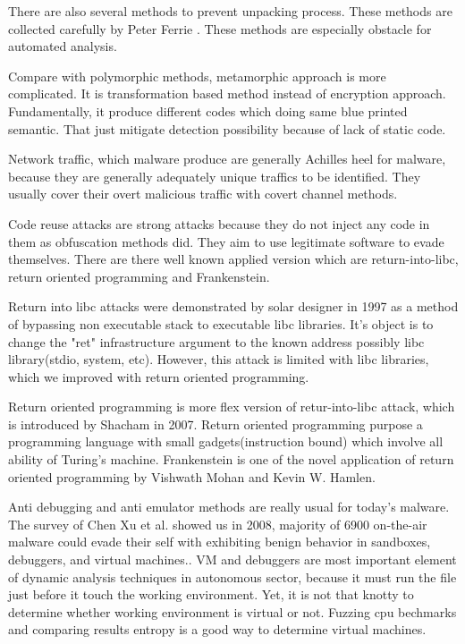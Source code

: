 There are also several methods to prevent unpacking process. These methods are collected carefully by Peter Ferrie \cite{ferrie2008anti}. These methods are especially obstacle for automated analysis.

Compare with polymorphic methods, metamorphic approach is more complicated. It is transformation based method instead of encryption  approach.\cite{konstantinou2008metamorphic} Fundamentally, it produce different codes which doing same blue printed semantic. That just mitigate detection possibility because of lack of static code. 

Network traffic, which malware produce are generally Achilles heel for malware, because they are generally adequately unique traffics to be identified\cite{marpaung2012survey}. They usually cover their overt malicious traffic with covert channel methods.\cite{rutkowska2006rootkits}

Code reuse attacks are strong attacks because they do not inject any code in them as obfuscation methods did. They aim to use legitimate software to evade themselves. There are there well known applied version which are return-into-libc, return oriented programming and Frankenstein.

Return into libc attacks were demonstrated by solar designer in 1997 as a method of bypassing non executable stack to executable libc libraries\cite{designer1997getting}. It's object is to change the "ret" infrastructure argument to the known address possibly libc library(stdio, system, etc). However, this attack is limited with libc libraries, which we improved with return oriented programming. 

Return oriented programming is more flex version of retur-into-libc attack, which is introduced by Shacham in 2007\cite{shacham2007geometry}. Return oriented programming purpose a programming language with small gadgets(instruction bound) which involve all ability of Turing's machine\cite{roemer2012return}. Frankenstein is one of the novel application of return oriented programming by Vishwath Mohan and Kevin W. Hamlen\cite{mohan2012frankenstein}.

Anti debugging and anti emulator methods are really usual for today's malware. The survey of Chen Xu et al. showed us in 2008, majority of 6900 on-the-air malware could evade their self with exhibiting benign behavior in sandboxes, debuggers, and virtual machines.\cite{chen2008towards}. VM and debuggers are most important element of dynamic analysis techniques in autonomous sector, because it must run the file just before it touch the working environment. Yet, it is not that knotty to determine whether working environment is virtual or not. Fuzzing cpu bechmarks and comparing results entropy is a good way to determine virtual machines.\cite{franklin2008remote}

